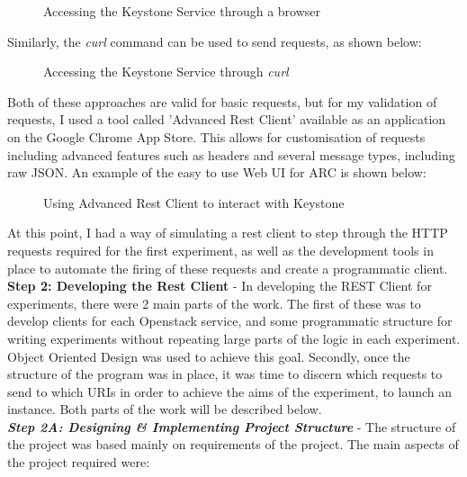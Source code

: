 \begin{figure}[H]
\centering
{}
\caption{Accessing the Keystone Service through a browser} 
\end{figure}

Similarly, the \textit{curl} command can be used to send requests, as shown below: 

\begin{figure}[H]
\centering
{}
\caption{Accessing the Keystone Service through \textit{curl}} 
\end{figure}

Both of these approaches are valid for basic requests, but for my validation of requests, I used a tool called 'Advanced Rest Client'\cite{advancedrestclient} available as an application on the Google Chrome App Store\cite{googleapps}. This allows for customisation of requests including advanced features such as headers and several message types, including raw JSON. An example of the easy to use Web UI for ARC is shown below: 

\begin{figure}[H]
\centering
{}
\caption{Using Advanced Rest Client to interact with Keystone} 
\end{figure}
 
At this point, I had a way of simulating a rest client to step through the HTTP requests required for the first experiment, as well as the development tools in place to automate the firing of these requests and create a programmatic client. \\

\textbf{Step 2: Developing the Rest Client} - In developing the REST Client for experiments, there were 2 main parts of the work. The first of these was to develop clients for each Openstack service, and some programmatic structure for writing experiments without repeating large parts of the logic in each experiment. Object Oriented Design was used to achieve this goal. Secondly, once the structure of the program was in place, it was time to discern which requests to send to which URIs in order to achieve the aims of the experiment, to launch an instance. Both parts of the work will be described below. \\

\textbf{\textit{Step 2A: Designing \& Implementing Project Structure}} - The structure of the project was based mainly on requirements of the project. The main aspects of the project required were:

